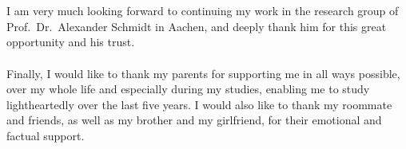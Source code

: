 \\ \\
I am very much looking forward to continuing my work in the research group of Prof.\ Dr.\ Alexander Schmidt in Aachen, and deeply thank him for this great opportunity and his trust.
\\ \\
Finally, I would like to thank my parents for supporting me in all ways possible, over my whole life and especially during my studies, enabling me to study lightheartedly over the last five years. I would also like to thank my roommate and friends, as well as my brother and my girlfriend, for their emotional and factual support.